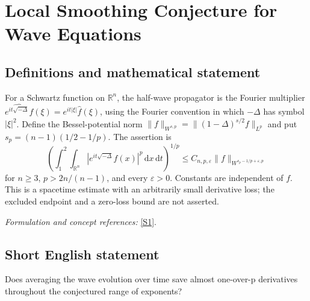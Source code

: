 \documentclass[11pt]{article}
\newcommand{\R}{\mathbb{R}}
\newcommand{\eps}{\varepsilon}
\newcommand{\dd}{\,\mathrm d}
\newcommand{\sref}[2]{\hyperlink{source:#1:#2}{[S#2]}}
\newif\ifshowcatalogue
\newcommand{\cataloguescope}[1]{\ifshowcatalogue
	\paragraph{Exact scope in the supplied catalogue.}
	\begin{quote}\small #1\end{quote}\fi}
\begin{document}
\setcounter{section}{200}
	\clearpage
	\section{\texorpdfstring{Local Smoothing Conjecture for Wave Equations}{Local Smoothing Conjecture for Wave Equations}}\label{201}
	\subsection{Definitions and mathematical statement}
	For a Schwartz function on $\R^n$, the half-wave propagator is the Fourier multiplier
	$\widehat{e^{it\sqrt{-\Delta}}f}(\xi)=e^{it|\xi|}\widehat f(\xi)$, using the Fourier convention in which $-\Delta$ has symbol $|\xi|^2$. Define the Bessel-potential norm
	$\|f\|_{W^{s,p}}=\|(1-\Delta)^{s/2}f\|_{L^p}$ and put $s_p=(n-1)(1/2-1/p)$. The assertion is
	\[
	\left(\int_1^2\int_{\R^n}|e^{it\sqrt{-\Delta}}f(x)|^p\dd x\dd t\right)^{1/p}
	\le C_{n,p,\eps}\|f\|_{W^{s_p-1/p+\eps,p}}
	\]
	for $n\ge3$, $p>2n/(n-1)$, and every $\eps>0$. Constants are independent of $f$. This is a spacetime estimate with an arbitrarily small derivative loss; the excluded endpoint and a zero-loss bound are not asserted.
	\par\smallskip\textit{Formulation and concept references:} \sref{201}{1}.
	\cataloguescope{For every n >= 3, p > 2n/(n-1), and epsilon > 0, prove ||exp(it sqrt(-Delta))f||\_\{L\textasciicircum{}p(R\textasciicircum{}n x [1,2])\} <= C\_\{p,epsilon\} ||f||\_\{W\textasciicircum{}\{s\_p-1/p+epsilon,p\}(R\textasciicircum{}n)\}, where s\_p=(n-1)(1/2-1/p).}
	\subsection{Short English statement}
	Does averaging the wave evolution over time save almost one-over-p derivatives throughout the conjectured range of exponents?
\end{document}
